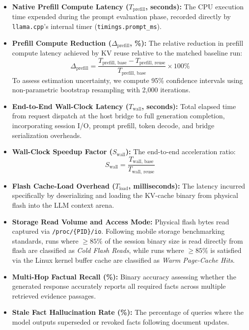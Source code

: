 \begin{itemize}
    \item \textbf{Native Prefill Compute Latency ($T_{\text{prefill}}$, seconds):} The CPU execution time expended during the prompt evaluation phase, recorded directly by \texttt{llama.cpp}'s internal timer (\texttt{timings.prompt\_ms}).
    \item \textbf{Prefill Compute Reduction ($\Delta_{\text{prefill}}$, \%):} The relative reduction in prefill compute latency achieved by KV reuse relative to the matched baseline run:
    \begin{equation}
        \Delta_{\text{prefill}} = \frac{T_{\text{prefill, base}} - T_{\text{prefill, reuse}}}{T_{\text{prefill, base}}} \times 100\%
    \end{equation}
    To assess estimation uncertainty, we compute 95\% confidence intervals using non-parametric bootstrap resampling with 2,000 iterations.
    \item \textbf{End-to-End Wall-Clock Latency ($T_{\text{wall}}$, seconds):} Total elapsed time from request dispatch at the host bridge to full generation completion, incorporating session I/O, prompt prefill, token decode, and bridge serialization overheads.
    \item \textbf{Wall-Clock Speedup Factor ($S_{\text{wall}}$):} The end-to-end acceleration ratio:
    \begin{equation}
        S_{\text{wall}} = \frac{T_{\text{wall, base}}}{T_{\text{wall, reuse}}}
    \end{equation}
    \item \textbf{Flash Cache-Load Overhead ($T_{\text{load}}$, milliseconds):} The latency incurred specifically by deserializing and loading the KV-cache binary from physical flash into the LLM context arena.
    \item \textbf{Storage Read Volume and Access Mode:} Physical flash bytes read captured via \texttt{/proc/\{PID\}/io}. Following mobile storage benchmarking standards, runs where $\ge 85\%$ of the session binary size is read directly from flash are classified as \emph{Cold Flash Reads}, while runs where $\ge 85\%$ is satisfied via the Linux kernel buffer cache are classified as \emph{Warm Page-Cache Hits}.
    \item \textbf{Multi-Hop Factual Recall (\%):} Binary accuracy assessing whether the generated response accurately reports all required facts across multiple retrieved evidence passages.
    \item \textbf{Stale Fact Hallucination Rate (\%):} The percentage of queries where the model outputs superseded or revoked facts following document updates.
\end{itemize}
